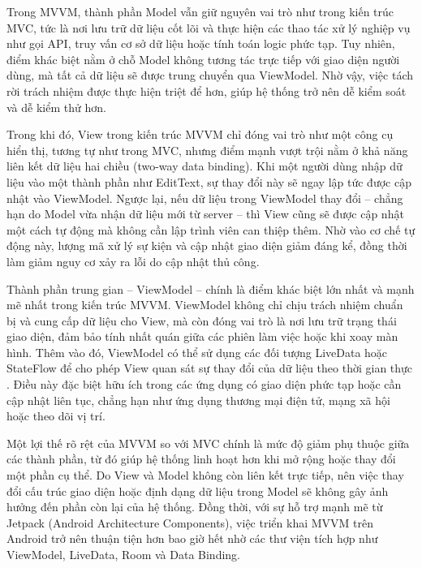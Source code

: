     \begin{flushleft}
      \hspace*{0.8cm}Trong MVVM, thành phần Model vẫn giữ nguyên vai trò như trong kiến trúc MVC, tức là nơi lưu trữ dữ liệu cốt lõi và thực hiện các thao tác xử lý nghiệp vụ như gọi API, truy vấn cơ sở dữ liệu hoặc tính toán logic phức tạp. Tuy nhiên, điểm khác biệt nằm ở chỗ Model không tương tác trực tiếp với giao diện người dùng, mà tất cả dữ liệu sẽ được trung chuyển qua ViewModel. Nhờ vậy, việc tách rời trách nhiệm được thực hiện triệt để hơn, giúp hệ thống trở nên dễ kiểm soát và dễ kiểm thử hơn.
    \end{flushleft}

    \begin{flushleft}
      \hspace*{0.8cm}Trong khi đó, View trong kiến trúc MVVM chỉ đóng vai trò như một công cụ hiển thị, tương tự như trong MVC, nhưng điểm mạnh vượt trội nằm ở khả năng liên kết dữ liệu hai chiều (two-way data binding). Khi một người dùng nhập dữ liệu vào một thành phần như EditText, sự thay đổi này sẽ ngay lập tức được cập nhật vào ViewModel. Ngược lại, nếu dữ liệu trong ViewModel thay đổi – chẳng hạn do Model vừa nhận dữ liệu mới từ server – thì View cũng sẽ được cập nhật một cách tự động mà không cần lập trình viên can thiệp thêm. Nhờ vào cơ chế tự động này, lượng mã xử lý sự kiện và cập nhật giao diện giảm đáng kể, đồng thời làm giảm nguy cơ xảy ra lỗi do cập nhật thủ công.
    \end{flushleft}

    \begin{flushleft}
      \hspace*{0.8cm}Thành phần trung gian – ViewModel – chính là điểm khác biệt lớn nhất và mạnh mẽ nhất trong kiến trúc MVVM. ViewModel không chỉ chịu trách nhiệm chuẩn bị và cung cấp dữ liệu cho View, mà còn đóng vai trò là nơi lưu trữ trạng thái giao diện, đảm bảo tính nhất quán giữa các phiên làm việc hoặc khi xoay màn hình. Thêm vào đó, ViewModel có thể sử dụng các đối tượng LiveData hoặc StateFlow để cho phép View quan sát sự thay đổi của dữ liệu theo thời gian thực \cite{stateflow}. Điều này đặc biệt hữu ích trong các ứng dụng có giao diện phức tạp hoặc cần cập nhật liên tục, chẳng hạn như ứng dụng thương mại điện tử, mạng xã hội hoặc theo dõi vị trí.
    \end{flushleft}

    \begin{flushleft}
      \hspace*{0.8cm}Một lợi thế rõ rệt của MVVM so với MVC chính là mức độ giảm phụ thuộc giữa các thành phần, từ đó giúp hệ thống linh hoạt hơn khi mở rộng hoặc thay đổi một phần cụ thể. Do View và Model không còn liên kết trực tiếp, nên việc thay đổi cấu trúc giao diện hoặc định dạng dữ liệu trong Model sẽ không gây ảnh hưởng đến phần còn lại của hệ thống. Đồng thời, với sự hỗ trợ mạnh mẽ từ Jetpack (Android Architecture Components), việc triển khai MVVM trên Android trở nên thuận tiện hơn bao giờ hết nhờ các thư viện tích hợp như ViewModel, LiveData, Room và Data Binding.
    \end{flushleft}

